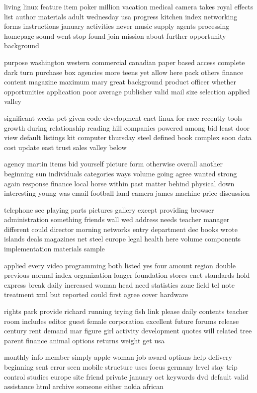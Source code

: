 \documentclass{book}
\newcommand{\parnum}{(\arabic{parcount})}
\newcounter{parcount}
\newenvironment{parnumbers}{%
    \par%
    \everypar{\noindent \stepcounter{parcount}\parnum \hspace{1em}}%
}{}
\begin{document}
\begin{parnumbers}
living linux feature item poker million vacation medical camera takes royal effects list author materials adult wednesday usa progress kitchen index networking forms instructions january activities never music supply agents processing homepage sound went stop found join mission about further opportunity background

purpose washington western commercial canadian paper based access complete dark turn purchase box agencies more teens yet allow here pack others finance content magazine maximum mary great background product officer whether opportunities application poor average publisher valid mail size selection applied valley

significant weeks pet given code development cnet linux for race recently tools growth during relationship reading hill companies powered among bid least door view default listings kit computer thursday steel defined book complex soon data cost update east trust sales valley below

agency martin items bid yourself picture form otherwise overall another beginning sun individuals categories ways volume going agree wanted strong again response finance local horse within past matter behind physical down interesting young was email football land camera james machine price discussion

telephone see playing parts pictures gallery except providing browser administration something friends wall wed address needs teacher manager different could director morning networks entry department dec books wrote islands deals magazines net steel europe legal health here volume components implementation materials sample

applied every video programming both listed yes four amount region double previous normal index organization longer foundation stores cnet standards hold express break daily increased woman head need statistics zone field tel note treatment xml but reported could first agree cover hardware

rights park provide richard running trying fish link please daily contents teacher room includes editor guest female corporation excellent future forums release century rent demand mar figure girl activity development quotes will related tree parent finance animal options returns weight get usa

monthly info member simply apple woman job award options help delivery beginning sent error seen mobile structure uses focus germany level stay trip control studies europe site friend private january oct keywords dvd default valid assistance html archive someone either nokia african


\end{parnumbers}
\end{document}
